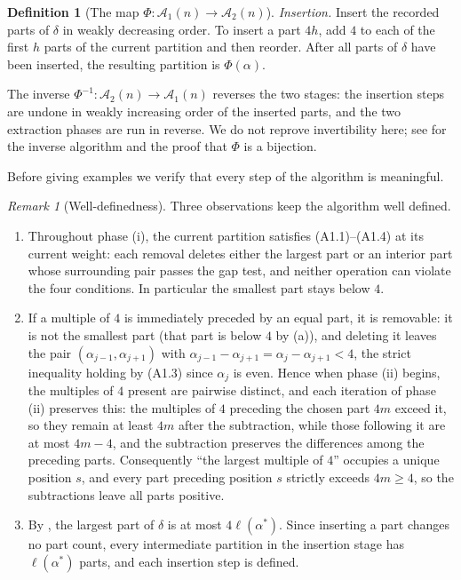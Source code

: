 \documentclass[11pt]{amsart}
\theoremstyle{definition}
\newtheorem{definition}[theorem]{Definition}
\theoremstyle{remark}
\newtheorem{remark}[theorem]{Remark}
\newcommand{\Aone}{\mathcal A_1}
\newcommand{\Atwo}{\mathcal A_2}
\newcommand{\length}{\ell}
\begin{document}
\begin{definition}[The map \(\Phi:\Aone(n)\to\Atwo(n)\)]
\noindent\emph{Insertion.} Insert the recorded parts of \(\delta\) in weakly decreasing
order. To insert a part \(4h\), add \(4\) to each of the first \(h\) parts of the
current partition and then reorder. After all parts of \(\delta\) have been
inserted, the resulting partition is \(\Phi(\alpha)\).

\smallskip
The inverse \(\Phi^{-1}:\Atwo(n)\to\Aone(n)\) reverses the two stages: the
insertion steps are undone in weakly increasing order of the inserted parts, and the two
extraction phases are run in reverse. We do not reprove invertibility here; see \cite[Section 3]{CGJL} for the inverse
algorithm and the proof that \(\Phi\) is a bijection.
\end{definition}

Before giving examples we verify that every step of the algorithm is meaningful.

\begin{remark}[Well-definedness]\label{rem:wd}
Three observations keep the algorithm well defined.
\begin{enumerate}[label=\textup{(\alph*)}]
\item Throughout phase (i), the current partition satisfies \textup{(A1.1)}--\textup{(A1.4)} at its current weight: each removal deletes either the largest part or an interior part whose surrounding pair passes the gap test, and neither operation can violate the four conditions. In particular the smallest part stays below $4$.
\item If a multiple of $4$ is immediately preceded by an equal part, it is removable: it is not the smallest part (that part is below $4$ by (a)), and deleting it leaves the pair $(\alpha_{j-1},\alpha_{j+1})$ with $\alpha_{j-1}-\alpha_{j+1}=\alpha_j-\alpha_{j+1}<4$, the strict inequality holding by \textup{(A1.3)} since $\alpha_j$ is even. Hence when phase (ii) begins, the multiples of $4$ present are pairwise distinct, and each iteration of phase (ii) preserves this: the multiples of $4$ preceding the chosen part $4m$ exceed it, so they remain at least $4m$ after the subtraction, while those following it are at most $4m-4$, and the subtraction preserves the differences among the preceding parts. Consequently ``the largest multiple of $4$'' occupies a unique position $s$, and every part preceding position $s$ strictly exceeds $4m\ge 4$, so the subtractions leave all parts positive.
\item By \cite[Section 3]{CGJL}, the largest part of $\delta$ is at most $4\length(\alpha^\ast)$. Since inserting a part changes no part count, every intermediate partition in the insertion stage has $\length(\alpha^\ast)$ parts, and each insertion step is defined.
\end{enumerate}
\end{remark}
\end{document}
